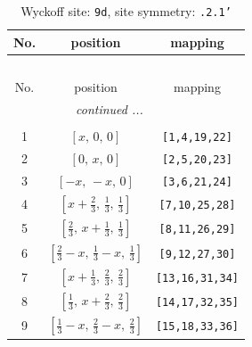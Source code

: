 \documentclass[fleqn,8pt]{jsarticle}
\begin{document}
\begin{longtable}{ccc}
\caption{Wyckoff site: {\tt 9d}, site symmetry: {\tt .2.1'}}
 \\
 \hline \hline
No. & position & mapping \\ \hline \endfirsthead

\multicolumn{2}{l}{\tablename\ \thetable{}} \\
 \hline \hline
No. & position & mapping \\ \hline \endhead

 \hline \hline
\multicolumn{2}{r}{\footnotesize\it continued ...} \\ \endfoot

 \hline \hline
\multicolumn{2}{r}{} \\ \endlastfoot

1 & $\left[ x,\, 0,\, 0 \right]$ & {\tt [1,4,19,22]} \\ \hline
2 & $\left[ 0,\, x,\, 0 \right]$ & {\tt [2,5,20,23]} \\ \hline
3 & $\left[ - x,\, - x,\, 0 \right]$ & {\tt [3,6,21,24]} \\ \hline
4 & $\left[ x + \frac{2}{3},\, \frac{1}{3},\, \frac{1}{3} \right]$ & {\tt [7,10,25,28]} \\ \hline
5 & $\left[ \frac{2}{3},\, x + \frac{1}{3},\, \frac{1}{3} \right]$ & {\tt [8,11,26,29]} \\ \hline
6 & $\left[ \frac{2}{3} - x,\, \frac{1}{3} - x,\, \frac{1}{3} \right]$ & {\tt [9,12,27,30]} \\ \hline
7 & $\left[ x + \frac{1}{3},\, \frac{2}{3},\, \frac{2}{3} \right]$ & {\tt [13,16,31,34]} \\ \hline
8 & $\left[ \frac{1}{3},\, x + \frac{2}{3},\, \frac{2}{3} \right]$ & {\tt [14,17,32,35]} \\ \hline
9 & $\left[ \frac{1}{3} - x,\, \frac{2}{3} - x,\, \frac{2}{3} \right]$ & {\tt [15,18,33,36]} \\
\end{longtable}
\renewcommand{\arraystretch}{1.2}
\end{document}
